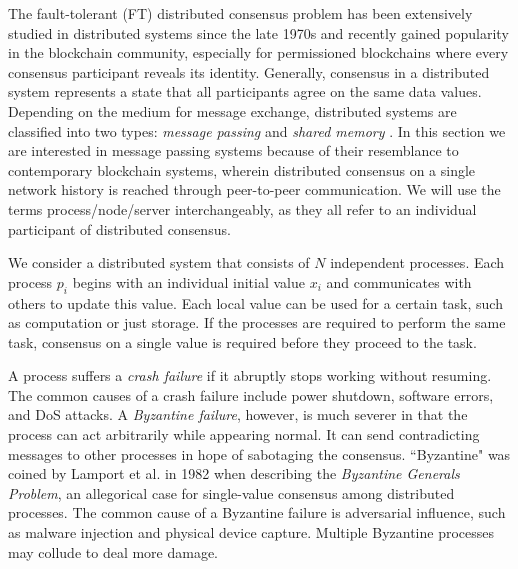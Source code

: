 \label{sec:background}
The fault-tolerant (FT) distributed consensus problem has been extensively studied in distributed systems since the late 1970s and recently gained popularity in the blockchain community, especially for permissioned blockchains where every consensus participant reveals its identity. Generally, consensus in a distributed system represents a state that all participants agree on the same data values. Depending on the medium for message exchange, distributed systems are classified into two types: \emph{message passing} and \emph{shared memory} . In this section we are interested in message passing systems because of their resemblance to contemporary blockchain systems, wherein distributed consensus on a single network history is reached through peer-to-peer communication. We will use the terms process/node/server interchangeably, as they all refer to an individual participant of distributed consensus.



We consider a distributed system that consists of $N$ independent processes. Each process $p_i$ begins with an individual initial value $x_i$ and communicates with others to update this value. Each local value can be used for a certain task, such as computation or just storage. If the processes are required to perform the same task, consensus on a single value is required before they proceed to the task.

A process suffers a \emph{crash failure} if it abruptly stops working without resuming. The common causes of a crash failure include power shutdown, software errors, and DoS attacks. A \emph{Byzantine failure}, however, is much severer in that the process can act arbitrarily while appearing normal. It can send contradicting messages to other processes in hope of sabotaging the consensus. ``Byzantine" was coined by Lamport et al.  in 1982 when describing the \emph{Byzantine Generals Problem}, an allegorical case for single-value consensus among distributed processes. The common cause of a Byzantine failure is adversarial influence, such as malware injection and physical device capture. Multiple Byzantine processes may collude to deal more damage.

